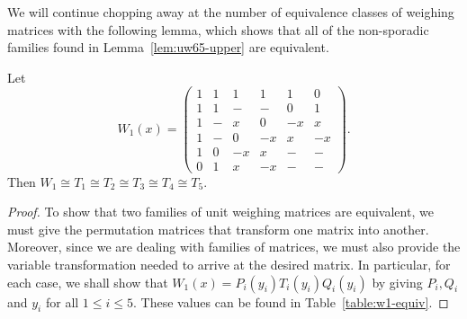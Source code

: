 We will continue chopping away at the number of equivalence classes of weighing matrices with the following lemma, which shows that all of the non-sporadic families found in Lemma~\ref{lem:uw65-upper} are equivalent.

\begin{lemma} \label{lem:w1}
 Let $$W_1(x) =\left(\begin{array}{rrrrrr}
               1 &  1 &  1 &  1 &  1 &  0 \\
               1 &  1 &  - &  - &  0 &  1 \\
               1 &  - &  x &  0 & -x &  x \\
               1 &  - &  0 & -x &  x & -x \\
               1 &  0 & -x &  x &  - &  - \\
               0 &  1 &  x & -x &  - &  -
             \end{array}\right).$$
Then $W_1 \cong T_1 \cong T_2 \cong T_3 \cong T_4 \cong T_5$.

\begin{proof}
 To show that two families of unit weighing matrices are equivalent, we must give the permutation matrices that transform one matrix into another. Moreover, since we are dealing with families of matrices, we must also provide the variable transformation needed to arrive at the desired matrix. In particular, for each case, we shall show that $W_1(x) = P_i(y_i)T_i(y_i)Q_i(y_i)$ by giving $P_i,Q_i$ and $y_i$ for all $1 \leq i \leq 5$. These values can be found in Table~\ref{table:w1-equiv}.


\end{proof}
\end{lemma}
